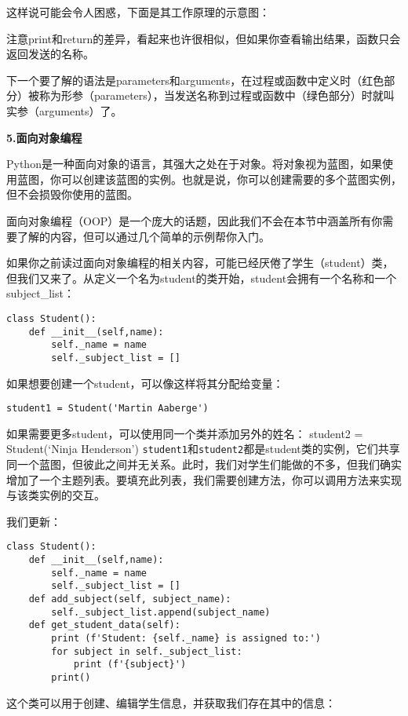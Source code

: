 \documentclass[]{ctexbook}
\begin{document}
这样说可能会令人困惑，下面是其工作原理的示意图：

注意print和return的差异，看起来也许很相似，但如果你查看输出结果，函数只会返回发送的名称。

下一个要了解的语法是parameters和arguments，在过程或函数中定义时（红色部分）被称为形参（parameters），当发送名称到过程或函数中（绿色部分）时就叫实参（arguments）了。

\textbf{5.面向对象编程}

Python是一种面向对象的语言，其强大之处在于对象。将对象视为蓝图，如果使用蓝图，你可以创建该蓝图的实例。也就是说，你可以创建需要的多个蓝图实例，但不会损毁你使用的蓝图。

面向对象编程（OOP）是一个庞大的话题，因此我们不会在本节中涵盖所有你需要了解的内容，但可以通过几个简单的示例帮你入门。

如果你之前读过面向对象编程的相关内容，可能已经厌倦了学生（student）类，但我们又来了。从定义一个名为student的类开始，student会拥有一个名称和一个subject\_list：

\begin{verbatim}
class Student():
    def __init__(self,name):
        self._name = name
        self._subject_list = []
\end{verbatim}

如果想要创建一个student，可以像这样将其分配给变量：

\begin{verbatim}
student1 = Student('Martin Aaberge')
\end{verbatim}

如果需要更多student，可以使用同一个类并添加另外的姓名：
student2 = Student(`Ninja Henderson')
\texttt{student1}和\texttt{student2}都是student类的实例，它们共享同一个蓝图，但彼此之间并无关系。此时，我们对学生们能做的不多，但我们确实增加了一个主题列表。要填充此列表，我们需要创建方法，你可以调用方法来实现与该类实例的交互。

我们更新：

\begin{verbatim}
class Student():
    def __init__(self,name):
        self._name = name
        self._subject_list = []
    def add_subject(self, subject_name):
        self._subject_list.append(subject_name)
    def get_student_data(self):
        print (f'Student: {self._name} is assigned to:')
        for subject in self._subject_list:
            print (f'{subject}')
        print()
\end{verbatim}

这个类可以用于创建、编辑学生信息，并获取我们存在其中的信息：
\end{document}
